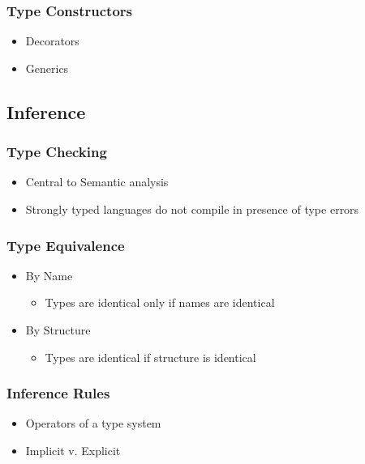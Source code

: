 \documentclass[usepdftitle=false,professionalfonts,compress ]{beamer}
\begin{document}
{
\begin{frame}\frametitle{Type Constructors}

	\begin{itemize}
	\item Decorators
			\item Generics
				\end{itemize}

\end{frame}}




\subsection{Inference}

{
\begin{frame}\frametitle{Type Checking}

	\begin{itemize}
	\item Central to Semantic analysis
			\item Strongly typed languages do not compile in presence of type errors
				\end{itemize}

\end{frame}}




{
\begin{frame}\frametitle{Type Equivalence}

	\begin{itemize}
	\item By Name

	\begin{itemize}
	\item Types are identical only if names are identical
				\end{itemize}

			\item By Structure

	\begin{itemize}
	\item Types are identical if structure is identical
				\end{itemize}

				\end{itemize}

\end{frame}}




{
\begin{frame}\frametitle{Inference Rules}

	\begin{itemize}
	\item Operators of a type system
			\item Implicit v. Explicit
				\end{itemize}

\end{frame}}
\end{document}
